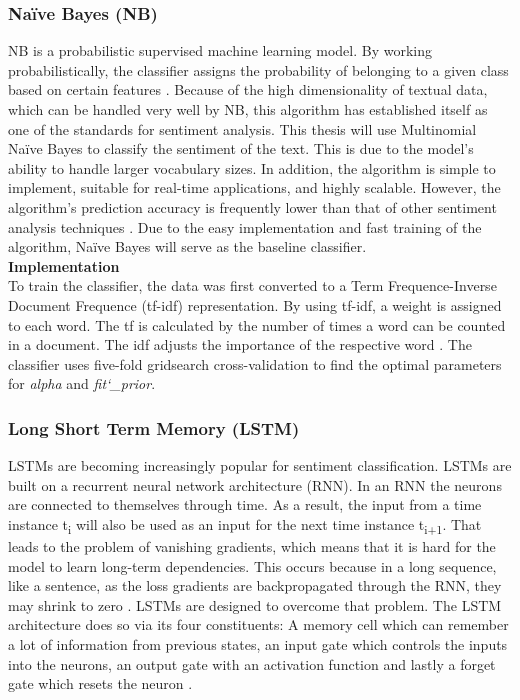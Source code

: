 \documentclass[11pt, a4paper]{article}
\begin{document}
\subsubsection{Naïve Bayes (NB)} \label{subs:naivebayes}
NB is a probabilistic supervised machine learning model. By working probabilistically, the classifier assigns the probability of 
belonging to a given class based on certain features \citep{jemai2021SentimentAnalysis}. Because of the high dimensionality of textual data, 
which can be handled very well by NB, this algorithm has established itself as one of the standards for sentiment analysis. 
This thesis will use Multinomial Naïve Bayes to classify the sentiment of the text. This is due to the model’s ability to handle 
larger vocabulary sizes. In addition, the algorithm is simple to implement, suitable for real-time applications, and highly scalable. 
However, the algorithm’s prediction accuracy is frequently lower than that of other sentiment analysis techniques \citep{song2017novelclassification}. 
Due to the easy implementation and fast training of the algorithm, Naïve Bayes will serve as the baseline classifier.\\

\noindent\textbf{Implementation}\\
To train the classifier, the data was first converted to a Term Frequence-Inverse Document Frequence (tf-idf) representation. By using tf-idf, a weight is
assigned to each word. The tf is calculated by the number of times a word can be counted in a document. The idf adjusts the importance of the respective word \citep{Guia2019ComparisonON}.
The classifier uses five-fold gridsearch cross-validation to find the optimal parameters for \emph{alpha} and \emph{fit\char`_prior}.\\

\subsubsection{Long Short Term Memory (LSTM)} \label{subs:lstm}
LSTMs are becoming increasingly popular for sentiment classification. 
LSTMs are built on a recurrent neural network architecture (RNN). In an RNN the neurons are connected to themselves through time. 
As a result, the input from a time instance t\textsubscript{i} will also be used as an input for the next time instance t\textsubscript{i+1}. That leads to the 
problem of vanishing gradients, which means that it is hard for the model to learn long-term dependencies. This occurs because
in a long sequence, like a sentence, as the loss gradients are backpropagated through the RNN, they may shrink to zero \citep{vanishinggradients2020pmlr}.
LSTMs are designed to overcome that problem.
The LSTM architecture does so via its four constituents: A memory cell which can remember a lot of information 
from previous states, an input gate which controls the inputs into the neurons, an output gate with an activation function 
and lastly a forget gate which resets the neuron \citep{priyantina2019sentimentanalysishotel}. \\
\end{document}
